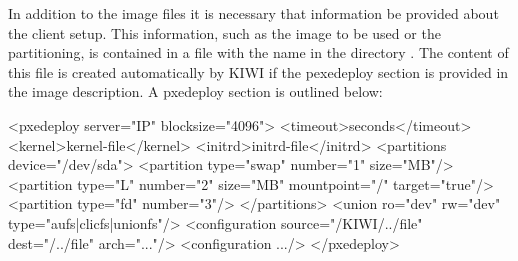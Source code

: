 \begin{itemize}
    In addition to the image files it is necessary that information be
    provided about the client setup. This information, such as the image
    to be used or the partitioning, is contained in a file with the name
     in the directory . The content
    of this file is created automatically by KIWI if the pexedeploy section
    is provided in the image description. A pxedeploy section is outlined
    below:

\begin{xml}
<pxedeploy server="IP" blocksize="4096">
  <timeout>seconds</timeout>
  <kernel>kernel-file</kernel>
  <initrd>initrd-file</initrd>
  <partitions device="/dev/sda">
    <partition type="swap" number="1" size="MB"/>
    <partition type="L" number="2" size="MB"
      mountpoint="/" target="true"/>
    <partition type="fd" number="3"/>
  </partitions>
  <union ro="dev" rw="dev" type="aufs|clicfs|unionfs"/>
  <configuration source="/KIWI/../file" dest="/../file"
                 arch="..."/>
  <configuration .../>
</pxedeploy>
\end{xml}


\end{itemize}
